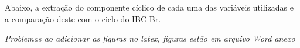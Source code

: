 \documentclass[
	article,			%
	11pt,				%
	oneside,			%
	a4paper,			%
	english,			%
	brazil,				%
	]{abntex2}
\begin{document}
\begin{appendices}
	Abaixo, a extração do componente cíclico de cada uma das variáveis utilizadas e a comparação deste com o ciclo do IBC-Br.
	
\textit{Problemas ao adicionar as figuras no latex, figuras estão em arquivo Word anexo}
	
\end{appendices}
\end{document}

